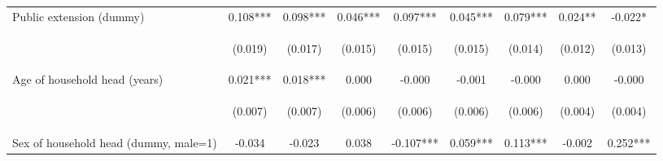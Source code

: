 \begin{center}
\begin{tabular}{lcccccccc}
Public extension (dummy) & 0.108*** & 0.098*** & 0.046*** & 0.097*** & 0.045*** & 0.079*** & 0.024** & -0.022* \\
\vspace{4pt} & \begin{footnotesize}(0.019)\end{footnotesize} & \begin{footnotesize}(0.017)\end{footnotesize} & \begin{footnotesize}(0.015)\end{footnotesize} & \begin{footnotesize}(0.015)\end{footnotesize} & \begin{footnotesize}(0.015)\end{footnotesize} & \begin{footnotesize}(0.014)\end{footnotesize} & \begin{footnotesize}(0.012)\end{footnotesize} & \begin{footnotesize}(0.013)\end{footnotesize} \\
Age of household head (years) & 0.021*** & 0.018*** & 0.000 & -0.000 & -0.001 & -0.000 & 0.000 & -0.000 \\
\vspace{4pt} & \begin{footnotesize}(0.007)\end{footnotesize} & \begin{footnotesize}(0.007)\end{footnotesize} & \begin{footnotesize}(0.006)\end{footnotesize} & \begin{footnotesize}(0.006)\end{footnotesize} & \begin{footnotesize}(0.006)\end{footnotesize} & \begin{footnotesize}(0.006)\end{footnotesize} & \begin{footnotesize}(0.004)\end{footnotesize} & \begin{footnotesize}(0.004)\end{footnotesize} \\
Sex of household head (dummy, male=1) & -0.034 & -0.023 & 0.038 & -0.107*** & 0.059*** & 0.113*** & -0.002 & 0.252*** \\

\end{tabular}
\end{center}
